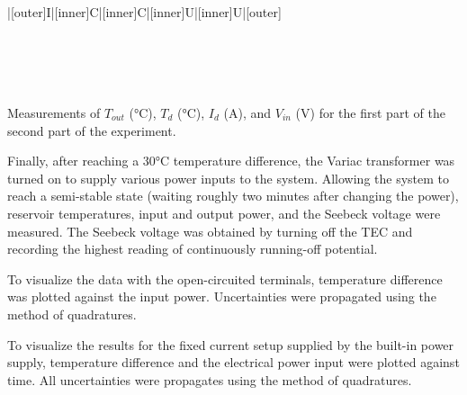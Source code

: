 \begin{paper}
{\begin{papertable}{|[outer]I|[inner]C|[inner]C|[inner]U|[inner]U|[outer]}
\papertableindex{}\\\paperiline
\papertableindex{}\\\paperiline
\papertableindex{}\\\paperiline
\papertableindex{}\\\paperiline
\papertableindex{}\\\paperoline
\end{papertable}\vspace{-0.5em}}{Measurements of $T_{out}$ ($\si{\celsius}$), $T_d$ ($\si{\celsius}$), $I_d$ ($\si{\ampere}$), and $V_{in}$ ($\si{\volt}$) for the first part of the second part of the experiment.}

	Finally, after reaching a \( 30 \si{\celsius} \) temperature difference, the Variac transformer was turned on to supply various power inputs to the system. Allowing the system to reach a semi-stable state (waiting roughly two minutes after changing the power), reservoir temperatures, input and output power, and the Seebeck voltage were measured. The Seebeck voltage was obtained by turning off the TEC and recording the highest reading of continuously running-off potential. 

	
	To visualize the data with the open-circuited terminals, temperature difference was plotted against the input power. Uncertainties were propagated using the method of quadratures.
	
	
	To visualize the results for the fixed current setup supplied by the built-in power supply, temperature difference and the electrical power input were plotted against time. All uncertainties were propagates using the method of quadratures.
	
	

\end{paper}
